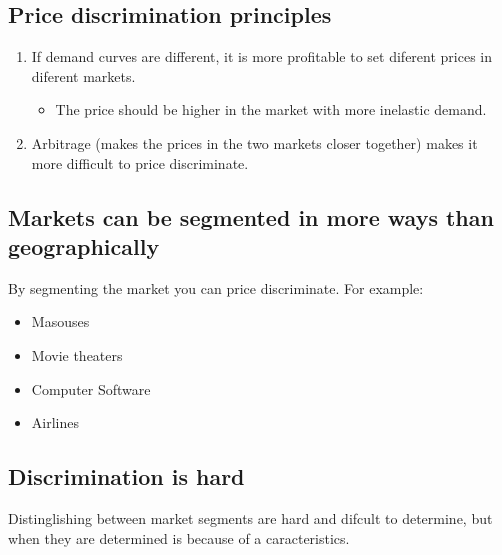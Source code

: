\documentclass{article}
\begin{document}
\subsection{Price discrimination principles}
\begin{enumerate}
    \item If demand curves are different, it is more profitable to set diferent prices in diferent markets.
        \begin{itemize}
            \item The price should be higher in the market with more inelastic demand.
        \end{itemize}
    
    \item Arbitrage (makes the prices in the two markets closer together) makes it more difficult to price discriminate. 
\end{enumerate} 


\subsection{Markets can be segmented in more ways than geographically}
By segmenting the market you can price discriminate. For example:
\begin{itemize}
    \item Masouses
    \item Movie theaters
    \item Computer Software 
    \item Airlines 
\end{itemize}


\subsection{Discrimination is hard}
Distinglishing between market segments are hard and difcult to determine, but when they are determined is because of a caracteristics. 





\end{document}
